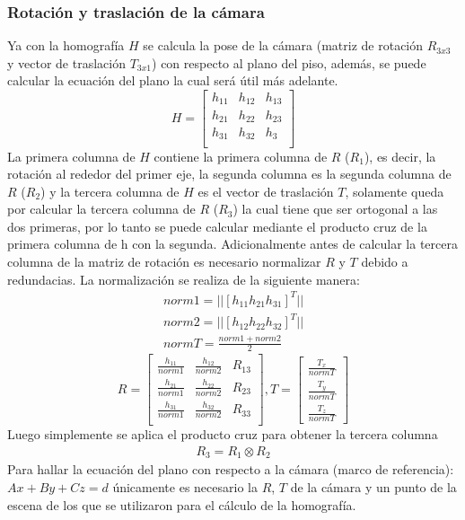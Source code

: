        \subsubsection{Rotación y traslación de la cámara}
       Ya con la homografía $H$ se calcula la pose de la cámara (matriz de rotación $R_{3x3}$ y vector de traslación $T_{3x1}$) con respecto al plano del piso, además, se puede calcular la ecuación del plano la cual será útil más adelante.\\
       \[H=
       \begin{bmatrix}
       h_{11} & h_{12} & h_{13}\\
       h_{21} & h_{22} & h_{23}\\
       h_{31} & h_{32} & h_{3}\\
       \end{bmatrix}
       \]          
       	La primera columna de $H$ contiene la primera columna de $R$ ($R_1$), es decir, la rotación al rededor del primer eje, la segunda columna es la segunda columna de $R$ ($R_2$) y la tercera columna de $H$ es el vector de traslación $T$, solamente queda por calcular la tercera columna de $R$ ($R_3$) la cual tiene que ser ortogonal a las dos primeras, por lo tanto se puede calcular mediante el producto cruz de la primera columna de h con la segunda. Adicionalmente antes de calcular la tercera columna de la matriz de rotación es necesario normalizar $R$ y $T$ debido a redundacias. La normalización se realiza de la siguiente manera:
       	\begin{eqnarray}
       	norm1=||[h_{11} h_{21} h_{31}]^T||\\
       	norm2=||[h_{12} h_{22} h_{32}]^T||\\
       	normT=\frac{norm1+norm2}{2}			
       	\end{eqnarray}
       	\[R=
       	\begin{bmatrix}
       	\frac{h_{11}}{norm1} & \frac{h_{12}}{norm2} & R_{13}\\
       	\frac{h_{21}}{norm1} & \frac{h_{22}}{norm2} & R_{23}\\
       	\frac{h_{31}}{norm1} & \frac{h_{32}}{norm2} & R_{33}\\
       	\end{bmatrix}
       	, T=
       	\begin{bmatrix}
       	\frac{T_x}{normT}\\
       	\frac{T_y}{normT}\\
       	\frac{T_z}{normT}	
       	\end{bmatrix}
       	\]
       	Luego simplemente se aplica el producto cruz para obtener la tercera columna
       	\begin{eqnarray}
       	R_3=R_1 \otimes R_2
       	\end{eqnarray}
       	Para hallar la ecuación del plano con respecto a la cámara (marco de referencia): $Ax+By+Cz=d$ únicamente es necesario la $R$, $T$ de la cámara y un punto de la escena de los que se utilizaron para el cálculo de la homografía.
